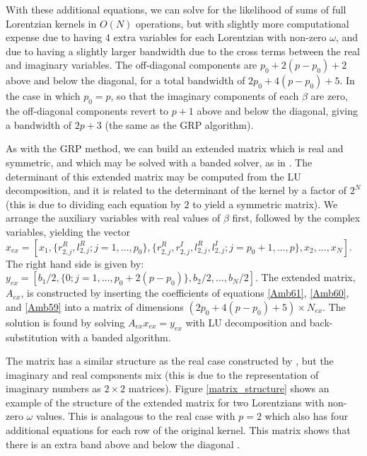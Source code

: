 \documentclass[manuscript, letterpaper]{aastex6}
\begin{document}
With these additional equations, we can solve for the likelihood of sums of full Lorentzian kernels 
in $O(N)$ operations, but with slightly more computational expense due to having 4 extra variables 
for each Lorentzian with non-zero $\omega$, and due to having a slightly larger bandwidth due to the 
cross terms between the real and imaginary variables.  The off-diagonal components are $p_0+2(p-p_0)+2$ above 
and below the diagonal, for a total bandwidth of $2p_0+4(p-p_0)+5$. In the case in which $p_0=p$, so 
that the imaginary components of each $\beta$ are zero, the off-diagonal components revert to $p+1$ 
above and below the diagonal, giving a bandwidth of $2p+3$ (the same as the GRP algorithm).

As with the GRP method, we can build an extended matrix which is real and symmetric, and which may be 
solved with a banded solver, as in \citet{NumericalRecipes}.  The determinant of this extended matrix 
may be computed from the LU decomposition, and it is related to the determinant of the kernel by a 
factor of $2^N$ (this is due to dividing each equation by $2$ to yield a symmetric matrix).
We arrange the auxiliary variables with real values of 
$\beta$ first, followed by the complex variables, yielding the vector
$x_{ex} = [x_1, \{r_{2,j}^R,l_{2,j}^R;j=1,...,p_0\}, \{r_{2,j}^R,r_{2,j}^I,l_{2,j}^R,l_{2,j}^I;j=p_0+1,...,p\},
x_2, ..., x_N]$.  The right hand side is given by: $y_{ex} = [b_1/2, \{0; j=1,...,p_0+2(p-p_0)\}, b_2/2, ..., b_N/2]$.
The extended matrix, $A_{ex}$, is constructed by inserting the coefficients of equations \ref{Amb61},
\ref{Amb60}, and \ref{Amb59} into a matrix of dimensions $(2p_0+4(p-p_0)+5) \times N_{ex}$.
The solution is found by solving $A_{ex} x_{ex} = y_{ex}$ with LU decomposition and back-substitution
with a banded algorithm.

The matrix has a similar structure as the real case constructed by \citep{Ambikasaran2015}, but the
imaginary and real components mix (this is due to the representation of imaginary numbers as
$2\times 2$ matrices).  Figure \ref{matrix_structure} shows an example of the structure of the extended
matrix for two Lorentzians with non-zero $\omega$ values.  This is analagous to the real case with
$p=2$ which also has four additional equations for each row of the original kernel.  This matrix shows
that there is an extra band above and below the diagonal \citep[compare with Figure 2 of][]{Ambikasaran2015}.
\end{document}
